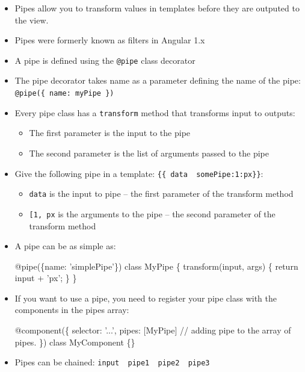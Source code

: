 \documentclass[12pt,]{article}
\newenvironment{Shaded}{}{}
\newcommand{\KeywordTok}[1]{\textcolor[rgb]{0.00,0.00,1.00}{{#1}}}
\newcommand{\CommentTok}[1]{\textcolor[rgb]{0.00,0.50,0.00}{{#1}}}
\newcommand{\FunctionTok}[1]{{#1}}
\newcommand{\NormalTok}[1]{{#1}}
\providecommand{\tightlist}{%
  \setlength{\itemsep}{0pt}\setlength{\parskip}{0pt}}
\begin{document}
\begin{itemize}
\item
  Pipes allow you to transform values in templates before they are
  outputed to the view.
\item
  Pipes were formerly known as filters in Angular 1.x
\item
  A pipe is defined using the \texttt{@pipe} class decorator
\item
  The pipe decorator takes name as a parameter defining the name of the
  pipe:
  \texttt{@pipe(\{\ name:\ \textquotesingle{}myPipe\textquotesingle{}\ \})}
\item
  Every pipe class has a \texttt{transform} method that transforms input
  to outputs:

  \begin{itemize}
  \tightlist
  \item
    The first parameter is the input to the pipe
  \item
    The second parameter is the list of arguments passed to the pipe
  \end{itemize}
\item
  Give the following pipe in a template:
  \texttt{\{\{\ data\ \textbar{}\ somePipe:1:\textquotesingle{}px\textquotesingle{}\}\}}:

  \begin{itemize}
  \tightlist
  \item
    \texttt{data} is the input to pipe -- the first parameter of the
    transform method
  \item
    \texttt{{[}1,\ \textquotesingle{}px\textquotesingle{}{]}} is the
    arguments to the pipe -- the second parameter of the transform
    method
  \end{itemize}
\item
  A pipe can be as simple as:

\begin{Shaded}
\begin{Highlighting}[numbers=left,,]
\FunctionTok{@pipe}\NormalTok{(\{name: 'simplePipe'\})}
\KeywordTok{class} \NormalTok{MyPipe \{}
  \FunctionTok{transform}\NormalTok{(input, args) \{ }\KeywordTok{return} \NormalTok{input + 'px'; \}}
\NormalTok{\}}
\end{Highlighting}
\end{Shaded}
\item
  If you want to use a pipe, you need to register your pipe class with
  the components in the pipes array:

\begin{Shaded}
\begin{Highlighting}[numbers=left,,]
\FunctionTok{@component}\NormalTok{(\{}
  \NormalTok{selector: '...',}
  \NormalTok{pipes: [MyPipe] }\CommentTok{// adding pipe to the array of pipes.}
\NormalTok{\})}
\KeywordTok{class} \NormalTok{MyComponent \{\}}
\end{Highlighting}
\end{Shaded}
\item
  Pipes can be chained:
  \texttt{input\ \textbar{}\ pipe1\ \textbar{}\ pipe2\ \textbar{}\ pipe3}


\end{itemize}
\end{document}
